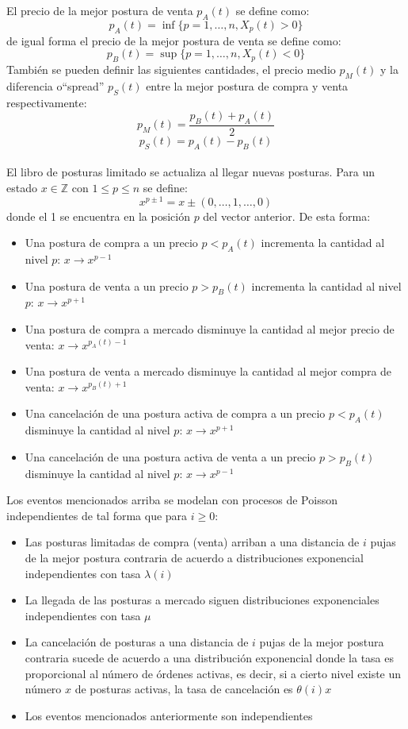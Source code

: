 \documentclass[11pt]{article}
\numberwithin{equation}{section} %
\begin{document}
El precio de la mejor postura de venta $p_A(t)$ se define como:
\[
p_A(t)= \inf\{p=1,\ldots,n,X_p(t)>0\}
\]
de igual forma el precio de la mejor postura de venta se define como:
\[
p_B(t)= \sup\{p=1,\ldots,n,X_p(t)<0\}
\]
También se pueden definir las siguientes cantidades, el precio medio $p_M(t)$ y la diferencia o``spread'' $p_S(t)$ entre la mejor postura de compra y venta respectivamente:
\[
p_M(t)=\frac{p_B(t)+p_A(t)}{2}
\]
\[
p_S(t)=p_A(t)-p_B(t)
\]\\

El libro de posturas limitado se actualiza al llegar nuevas posturas. Para un estado $x \in \mathbb{Z}$ con $1\leq p \leq n$ se define:
\[
x^{p\pm 1}=x \pm (0,\ldots,1,\ldots,0)
\]
donde el 1 se encuentra en la posición $p$ del vector anterior. De esta forma:
\begin{itemize}
\item Una postura de compra a un precio $p<p_A(t)$ incrementa la cantidad al nivel $p$: $x\rightarrow x^{p-1}$
\item Una postura de venta a un precio $p>p_B(t)$ incrementa la cantidad al nivel $p$: $x\rightarrow x^{p+1}$
\item Una postura de compra a mercado disminuye la cantidad al mejor precio de venta: $x\rightarrow x^{p_A(t)-1}$
\item Una postura de venta a mercado disminuye la cantidad al mejor compra de venta: $x\rightarrow x^{p_B(t)+1}$
\item Una cancelación de una postura activa de compra a un precio $p<p_A(t)$ disminuye la cantidad al nivel $p$: $x\rightarrow x^{p+1}$
\item Una cancelación de una postura activa de venta a un precio $p>p_B(t)$ disminuye la cantidad al nivel $p$: $x\rightarrow x^{p-1}$\\
\end{itemize}

Los eventos mencionados arriba se modelan con procesos de Poisson independientes de tal forma que para $i \geq 0$:
\begin{itemize}
\item Las posturas limitadas de compra (venta) arriban a una distancia de $i$ pujas de la mejor postura contraria de acuerdo a distribuciones exponencial independientes con tasa $\lambda(i)$
\item La llegada de las posturas a mercado siguen distribuciones exponenciales independientes con tasa $\mu$
\item La cancelación de posturas a una distancia de $i$ pujas de la mejor postura contraria sucede de acuerdo a una distribución exponencial donde la tasa es proporcional al número de órdenes activas, es decir, si a cierto nivel existe un número $x$ de posturas activas, la tasa de cancelación es $\theta(i)x$
\item Los eventos mencionados anteriormente son independientes\\
\end{itemize}
\end{document}
